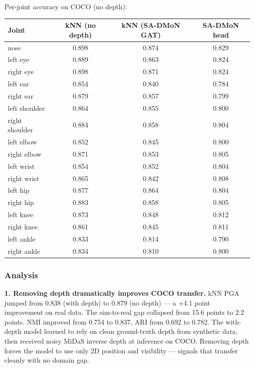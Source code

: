 Per-joint accuracy on COCO (no depth):

\begin{center}
\small
\begin{tabular}{lccc}
\toprule
Joint & kNN (no depth) & kNN (SA-DMoN GAT) & SA-DMoN head \\
\midrule
nose & 0.898 & 0.874 & 0.829 \\
left eye & 0.889 & 0.863 & 0.824 \\
right eye & 0.898 & 0.871 & 0.824 \\
left ear & 0.854 & 0.840 & 0.784 \\
right ear & 0.879 & 0.857 & 0.799 \\
left shoulder & 0.864 & 0.855 & 0.800 \\
right shoulder & 0.884 & 0.858 & 0.804 \\
left elbow & 0.852 & 0.845 & 0.800 \\
right elbow & 0.871 & 0.853 & 0.805 \\
left wrist & 0.854 & 0.852 & 0.804 \\
right wrist & 0.865 & 0.842 & 0.808 \\
left hip & 0.877 & 0.864 & 0.804 \\
right hip & 0.883 & 0.858 & 0.805 \\
left knee & 0.873 & 0.848 & 0.812 \\
right knee & 0.861 & 0.845 & 0.811 \\
left ankle & 0.833 & 0.814 & 0.790 \\
right ankle & 0.834 & 0.810 & 0.800 \\
\bottomrule
\end{tabular}
\end{center}


\subsubsection{Analysis}

\textbf{1. Removing depth dramatically improves COCO transfer.} kNN PGA jumped from 0.838 (with depth) to 0.879 (no depth) --- a +4.1 point improvement on real data. The sim-to-real gap collapsed from 15.6 points to 2.2 points. NMI improved from 0.754 to 0.837, ARI from 0.692 to 0.782. The with-depth model learned to rely on clean ground-truth depth from synthetic data, then received noisy MiDaS inverse depth at inference on COCO. Removing depth forces the model to use only 2D position and visibility --- signals that transfer cleanly with no domain gap.

